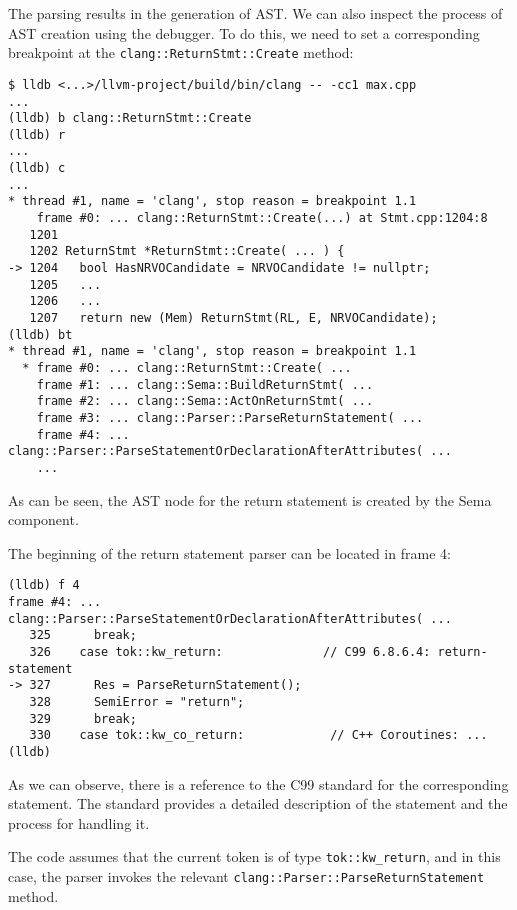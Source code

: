 The parsing results in the generation of AST. We can
also inspect the process of AST creation using the debugger. To do this, we need
to set a corresponding breakpoint at the
\texttt{clang::ReturnStmt::Create} method: 
\begin{verbatim}
$ lldb <...>/llvm-project/build/bin/clang -- -cc1 max.cpp
...
(lldb) b clang::ReturnStmt::Create
(lldb) r
...
(lldb) c
...  
* thread #1, name = 'clang', stop reason = breakpoint 1.1
    frame #0: ... clang::ReturnStmt::Create(...) at Stmt.cpp:1204:8
   1201 
   1202 ReturnStmt *ReturnStmt::Create( ... ) {
-> 1204   bool HasNRVOCandidate = NRVOCandidate != nullptr;
   1205   ...
   1206   ...
   1207   return new (Mem) ReturnStmt(RL, E, NRVOCandidate);
(lldb) bt
* thread #1, name = 'clang', stop reason = breakpoint 1.1
  * frame #0: ... clang::ReturnStmt::Create( ...
    frame #1: ... clang::Sema::BuildReturnStmt( ...
    frame #2: ... clang::Sema::ActOnReturnStmt( ...
    frame #3: ... clang::Parser::ParseReturnStatement( ...
    frame #4: ... clang::Parser::ParseStatementOrDeclarationAfterAttributes( ...
    ...
\end{verbatim}
As can be seen, the AST node for the return statement is created by the Sema
component. 

The beginning of the return statement parser can be located in frame 4:
\begin{verbatim}
(lldb) f 4
frame #4: ... clang::Parser::ParseStatementOrDeclarationAfterAttributes( ...
   325      break;
   326    case tok::kw_return:              // C99 6.8.6.4: return-statement
-> 327      Res = ParseReturnStatement();
   328      SemiError = "return";
   329      break;
   330    case tok::kw_co_return:            // C++ Coroutines: ...
(lldb) 
\end{verbatim}
As we can observe, there is a reference to the C99 standard \citep{standard:c99}
for the corresponding statement. The standard \citep{standard:c99} provides a
detailed description of the statement and the process for handling it. 

The code assumes that the current token is of type
\texttt{tok::kw_return}, and in this case, the parser invokes the
relevant \texttt{clang::Parser::ParseReturnStatement} method. 


